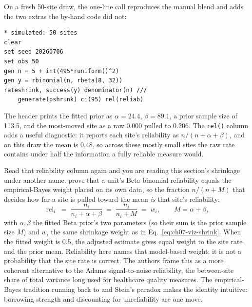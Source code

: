 On a fresh 50-site draw, the one-line call reproduces the manual blend and adds the two extras the by-hand code did not:
\par
{\footnotesize
\begin{verbatim}
* simulated: 50 sites
clear
set seed 20260706
set obs 50
gen n = 5 + int(495*runiform()^2)
gen y = rbinomial(n, rbeta(8, 32))
rateshrink, success(y) denominator(n) ///
    generate(pshrunk) ci(95) rel(reliab)
\end{verbatim}
}
The header prints the fitted prior as $\alpha=24.4$, $\beta=89.1$, a prior sample size of 113.5, and the most-moved site as a raw 0.000 pulled to 0.206. The \texttt{rel()} column adds a useful diagnostic: it reports each site's reliability as $n/(n+\alpha+\beta)$, and on this draw the mean is 0.48, so across these mostly small sites the raw rate contains under half the information a fully reliable measure would.

Read that reliability column again and you are reading this section's shrinkage under another name. \textcite{field2026betabin} prove that a unit's Beta-binomial reliability equals the empirical-Bayes weight placed on its own data, so the fraction $n/(n+M)$ that decides how far a site is pulled toward the mean \emph{is} that site's reliability:
\begin{equation}
  \operatorname{rel}_i
    \;=\; \frac{n_i}{n_i + \alpha + \beta}
    \;=\; \frac{n_i}{n_i + M}
    \;=\; w_i,
  \qquad M = \alpha + \beta,
  \label{eq:ch07-viz-relid}
\end{equation}
with $\alpha,\beta$ the fitted Beta prior's two parameters (so their sum is the prior sample size $M$) and $w_i$ the same shrinkage weight as in Eq.~\eqref{eq:ch07-viz-shrink}. When the fitted weight is 0.5, the adjusted estimate gives equal weight to the site rate and the prior mean. Reliability here names that model-based weight; it is not a probability that the site rate is correct. The authors frame this as a more coherent alternative to the Adams signal-to-noise reliability, the between-site share of total variance long used for healthcare quality measures. The empirical-Bayes tradition running back to \textcite{efron1975data} and Stein's paradox makes the identity intuitive: borrowing strength and discounting for unreliability are one move.

